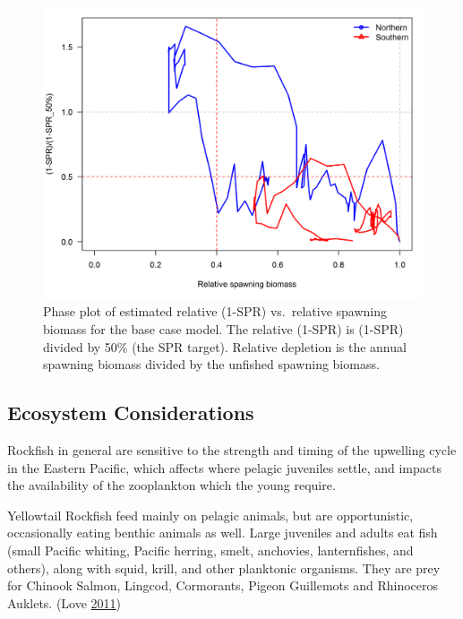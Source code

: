 \documentclass[12pt,]{article}
\begin{document}
\begin{figure}[htbp]
\centering
\includegraphics{r4ss/plots_compare/base_compare13_phase_plot.png}
\caption{Phase plot of estimated relative (1-SPR) vs.~relative spawning
biomass for the base case model. The relative (1-SPR) is (1-SPR) divided
by 50\% (the SPR target). Relative depletion is the annual spawning
biomass divided by the unfished spawning biomass. \label{fig:Phase_all}}
\end{figure}

\FloatBarrier

\subsection*{Ecosystem Considerations}\label{ecosystem-considerations}

Rockfish in general are sensitive to the strength and timing of the
upwelling cycle in the Eastern Pacific, which affects where pelagic
juveniles settle, and impacts the availability of the zooplankton which
the young require.

Yellowtail Rockfish feed mainly on pelagic animals, but are
opportunistic, occasionally eating benthic animals as well. Large
juveniles and adults eat fish (small Pacific whiting, Pacific herring,
smelt, anchovies, lanternfishes, and others), along with squid, krill,
and other planktonic organisms. They are prey for Chinook Salmon,
Lingcod, Cormorants, Pigeon Guillemots and Rhinoceros Auklets. (Love
\protect\hyperlink{ref-Love2011}{2011})
\end{document}

